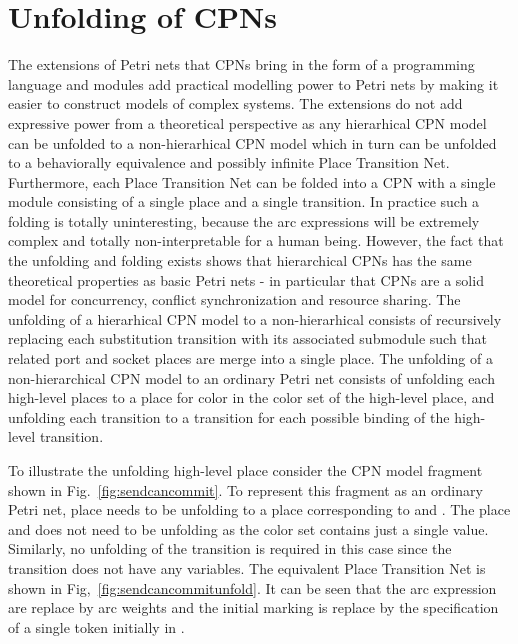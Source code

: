 \section{Unfolding of CPNs}

The extensions of Petri nets that CPNs bring in the form of a
programming language and modules add practical modelling power to
Petri nets by making it easier to construct models of complex
systems. The extensions do not add expressive power from a theoretical
perspective as any hierarhical CPN model can be unfolded to a
non-hierarhical CPN model which in turn can be unfolded to a
behaviorally equivalence and possibly infinite Place Transition
Net. Furthermore, each Place Transition Net can be folded into a CPN
with a single module consisting of a single place and a single
transition. In practice such a folding is totally uninteresting,
because the arc expressions will be extremely complex and totally
non-interpretable for a human being. However, the fact that the
unfolding and folding exists shows that hierarchical CPNs has the same
theoretical properties as basic Petri nets - in particular that CPNs
are a solid model for concurrency, conflict synchronization and
resource sharing. The unfolding of a hierarhical CPN model to a
non-hierarhical consists of recursively replacing each substitution
transition with its associated submodule such that related port and
socket places are merge into a single place. The unfolding of a
non-hierarchical CPN model to an ordinary Petri net consists of
unfolding each high-level places to a place for color in the color set
of the high-level place, and unfolding each transition to a transition
for each possible binding of the high-level transition.




To illustrate the unfolding high-level place consider the CPN model
fragment shown in Fig.~\ref{fig:sendcancommit}. To represent this
fragment as an ordinary Petri net, place  needs to
be unfolding to a place corresponding to  and
. The place  and 
does not need to be unfolding as the  color set contains
just a single value. Similarly, no unfolding of the
 transition is required in this case since the
transition does not have any variables. The equivalent Place
Transition Net is shown in Fig,~\ref{fig:sendcancommitunfold}. It can
be seen that the arc expression are replace by arc weights and the
initial marking is replace by the specification of a single token
initially in .

